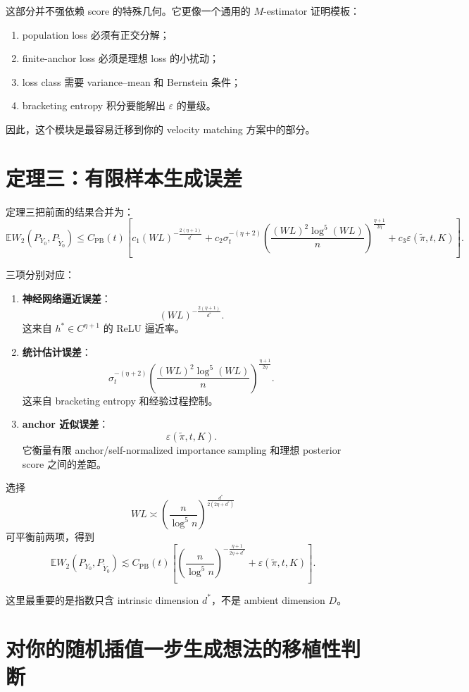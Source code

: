 \documentclass[UTF8,11pt]{ctexart}
\newcommand{\E}{\mathbb{E}}
\begin{document}
这部分并不强依赖 score 的特殊几何。它更像一个通用的 \(M\)-estimator 证明模板：
\begin{enumerate}
\item population loss 必须有正交分解；
\item finite-anchor loss 必须是理想 loss 的小扰动；
\item loss class 需要 variance--mean 和 Bernstein 条件；
\item bracketing entropy 积分要能解出 \(\varepsilon\) 的量级。
\end{enumerate}

因此，这个模块是最容易迁移到你的 velocity matching 方案中的部分。

\section{定理三：有限样本生成误差}

定理三把前面的结果合并为：
\[
\E W_2(P_{Y_0},P_{\widetilde Y_0})
\le
C_{\mathrm{PB}}(t)
\left[
c_1(WL)^{-\frac{2(\eta+1)}{d^*}}
+
c_2\sigma_t^{-(\eta+2)}
\left(
\frac{(WL)^2\log^5(WL)}{n}
\right)^{\frac{\eta+1}{2\eta}}
+
c_3\varepsilon(\widetilde\pi,t,K)
\right].
\]

三项分别对应：
\begin{enumerate}
\item \textbf{神经网络逼近误差}：
\[
(WL)^{-\frac{2(\eta+1)}{d^*}}.
\]
这来自 \(h^*\in C^{\eta+1}\) 的 ReLU 逼近率。
\item \textbf{统计估计误差}：
\[
\sigma_t^{-(\eta+2)}
\left(
\frac{(WL)^2\log^5(WL)}{n}
\right)^{\frac{\eta+1}{2\eta}}.
\]
这来自 bracketing entropy 和经验过程控制。
\item \textbf{anchor 近似误差}：
\[
\varepsilon(\widetilde\pi,t,K).
\]
它衡量有限 anchor/self-normalized importance sampling 和理想 posterior score 之间的差距。
\end{enumerate}

选择
\[
WL
\asymp
\left(
\frac{n}{\log^5 n}
\right)^{\frac{d^*}{2(2\eta+d^*)}}
\]
可平衡前两项，得到
\[
\E W_2(P_{Y_0},P_{\widetilde Y_0})
\lesssim
C_{\mathrm{PB}}(t)
\left[
\left(
\frac{n}{\log^5 n}
\right)^{-\frac{\eta+1}{2\eta+d^*}}
+
\varepsilon(\widetilde\pi,t,K)
\right].
\]

这里最重要的是指数只含 intrinsic dimension \(d^*\)，不是 ambient dimension \(D\)。

\section{对你的随机插值一步生成想法的移植性判断}
\end{document}
